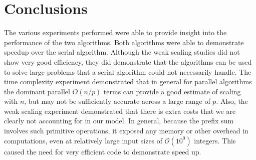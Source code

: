 \documentclass[12pt]{article}
\begin{document}
{{{%

\section{Conclusions}

The various experiments performed were able to provide insight into the performance
of the two algorithms.  Both algorithms were able to demonstrate speedup
over the serial algorithm.  Although the weak scaling studies did not show very good efficiency,
they did demonstrate that the algorithms can be used to solve large problems that a
serial algorithm could not necessarily handle.  The time complexity experiment
demonstrated that in general for parallel algorithms the dominant parallel $O(n/p)$
terms can provide a good estimate of scaling with $n$, but may not be sufficiently
accurate across a large range of $p$. Also, the weak scaling experiment demonstrated that there is extra costs that we are
clearly not accounting for in our model. In general, because the prefix sum involves such primitive operations, it exposed any memory or
other overhead in computations, even at relatively large input sizes of
$\mathcal{O}(10^9)$ integers.  This caused the need for very efficient code to demonstrate speed
up. 

}}}
\end{document}
